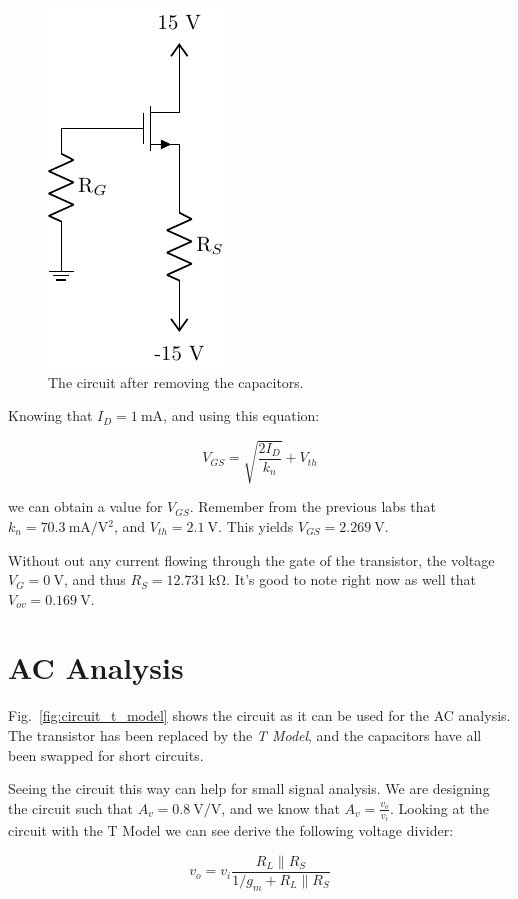 \documentclass{../../ece-report}
\begin{document}
\begin{figure}[h!]
  \centering
    \includegraphics{../circuits/circuit_dc.pdf}
  \caption{The circuit after removing the capacitors.}\label{fig:circuit_dc}
\end{figure}

Knowing that $I_D = 1~\si{\mA}$, and using this equation:

\[
  V_{GS} = \sqrt{\frac{2 I_D}{k_n}} + V_{th}
\]

we can obtain a value for $V_{GS}$. Remember from the
previous labs that $k_n = 70.3~\si{\mA / \V ^2}$, and
$V_{th} = 2.1~\si{\V}$. This yields $V_{GS} = 2.269~\si{\V}$.

Without out any current flowing through the gate of
the transistor, the voltage $V_G=0~\si{\V}$, and thus
$R_S = 12.731~\si{\kohm}$. It's good to note right now
as well that $V_{ov} = 0.169~\si{\V}$.

\section{AC Analysis}

Fig.~\ref{fig:circuit_t_model} shows the circuit as
it can be used for the AC analysis. The transistor
has been replaced by the \emph{T Model}, and the capacitors
have all been swapped for short circuits.

Seeing the circuit this way can help for small signal analysis.
We are designing the circuit such that $A_v = 0.8~\si{\V/\V}$, and
we know that $A_v = \frac{v_o}{v_i}$. Looking at the circuit
with the T Model we can see derive the following voltage divider:

\[
  v_o = v_i \frac{R_L \| R_S}{1/g_m + R_L \| R_S}
\]
\end{document}
